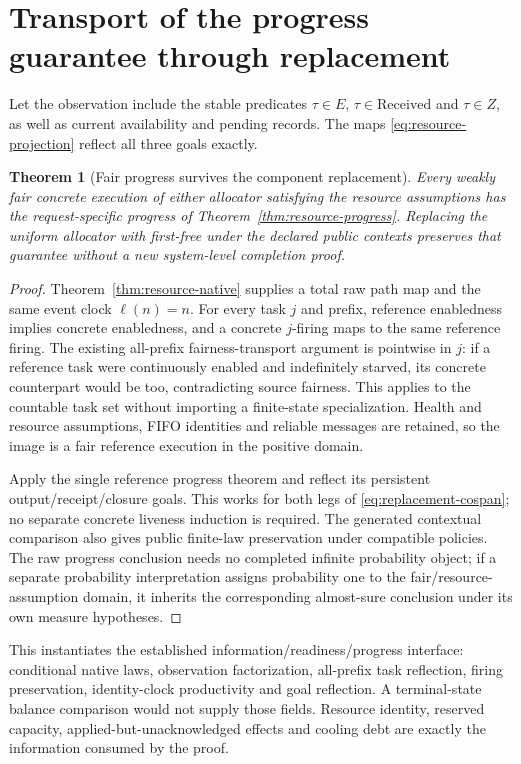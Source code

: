 \documentclass[11pt]{article}
\newtheorem{theorem}{Theorem}
\begin{document}
\section{Transport of the progress guarantee through replacement}

Let the observation include the stable predicates $\tau\in E$, $\tau\in\mathrm{Received}$ and $\tau\in Z$, as well as current availability and pending records. The maps \eqref{eq:resource-projection} reflect all three goals exactly.

\begin{theorem}[Fair progress survives the component replacement]\label{thm:resource-progress-transfer}
Every weakly fair concrete execution of either allocator satisfying the resource assumptions has the request-specific progress of Theorem~\ref{thm:resource-progress}. Replacing the uniform allocator with first-free under the declared public contexts preserves that guarantee without a new system-level completion proof.
\end{theorem}
\begin{proof}
Theorem~\ref{thm:resource-native} supplies a total raw path map and the same event clock $\ell(n)=n$. For every task $j$ and prefix, reference enabledness implies concrete enabledness, and a concrete $j$-firing maps to the same reference firing. The existing all-prefix fairness-transport argument is pointwise in $j$: if a reference task were continuously enabled and indefinitely starved, its concrete counterpart would be too, contradicting source fairness. This applies to the countable task set without importing a finite-state specialization. Health and resource assumptions, FIFO identities and reliable messages are retained, so the image is a fair reference execution in the positive domain.

Apply the single reference progress theorem and reflect its persistent output/receipt/closure goals. This works for both legs of \eqref{eq:replacement-cospan}; no separate concrete liveness induction is required. The generated contextual comparison also gives public finite-law preservation under compatible policies. The raw progress conclusion needs no completed infinite probability object; if a separate probability interpretation assigns probability one to the fair/resource-assumption domain, it inherits the corresponding almost-sure conclusion under its own measure hypotheses.
\end{proof}

This instantiates the established information/readiness/progress interface: conditional native laws, observation factorization, all-prefix task reflection, firing preservation, identity-clock productivity and goal reflection. A terminal-state balance comparison would not supply those fields. Resource identity, reserved capacity, applied-but-unacknowledged effects and cooling debt are exactly the information consumed by the proof.
\end{document}
